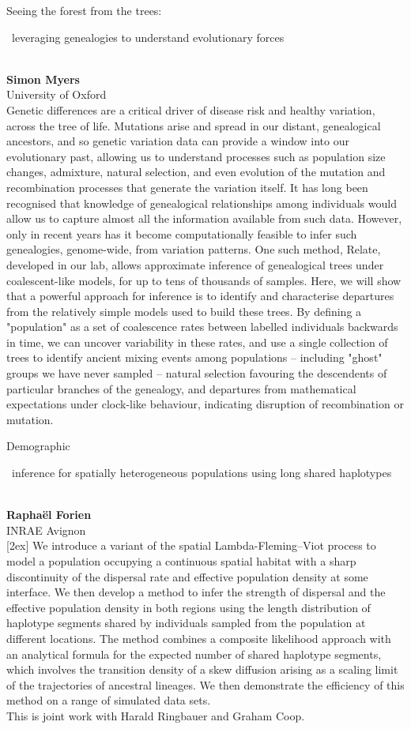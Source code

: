 \documentclass[12pt,a4paper]{article}
\newcommand{\ZAbst}{\rule[-1ex]{0pt}{2ex}\ } %
\begin{document}
\noindent
{\Large Seeing the forest from the trees:\ZAbst leveraging genealogies to understand evolutionary forces}\\[1ex]
{\large 
\textbf{Simon Myers}\\[1ex] University of Oxford}\\[2ex]
Genetic differences are a critical driver of disease risk and healthy variation, across the tree of life. Mutations arise and spread in our distant, genealogical ancestors, and so genetic variation data can provide a window into our evolutionary past, allowing us to understand processes such as population size changes, admixture, natural selection, and even evolution of the mutation and recombination processes that generate the variation itself. It has long been recognised that knowledge of genealogical relationships among individuals would allow us to capture almost all the information available from such data. However, only in recent years has it become computationally feasible to infer such genealogies, genome-wide, from variation patterns. One such method, Relate, developed in our lab, allows approximate inference of genealogical trees under coalescent-like models, for up to tens of thousands of samples. Here, we will show that a powerful approach for inference is to identify and characterise departures from the relatively simple models used to build these trees. By defining a "population" as a set of coalescence rates between labelled individuals backwards in time, we can uncover variability in these rates, and use a single collection of trees to identify ancient mixing events among populations -- including "ghost" groups we have never sampled -- natural selection favouring the descendents of particular branches of the genealogy, and departures from mathematical expectations under clock-like behaviour, indicating disruption of recombination or mutation.

\bigskip \bigskip 

\noindent
{\Large \sloppy Demographic \ZAbst inference for spatially heterogeneous populations using long shared haplotypes}\\[1ex]
{\large 
\textbf{Raphaël Forien}\\[1ex] INRAE Avignon}\\
[2ex]
We introduce a variant of the spatial Lambda-Fleming–Viot process to model a population occupying a continuous spatial habitat with a sharp discontinuity of the dispersal rate and effective population density at some interface. We then develop a method to infer the strength of dispersal and the effective population density in both regions using the length distribution of haplotype segments shared by individuals sampled from the population at different locations. The method combines a composite likelihood approach with an analytical formula for the expected number of shared haplotype segments, which involves the transition density of a skew diffusion arising as a scaling limit of the trajectories of ancestral lineages. We then demonstrate the efficiency of this method on a range of simulated data sets.
\\
This is joint work with Harald Ringbauer and Graham Coop.
\end{document}
